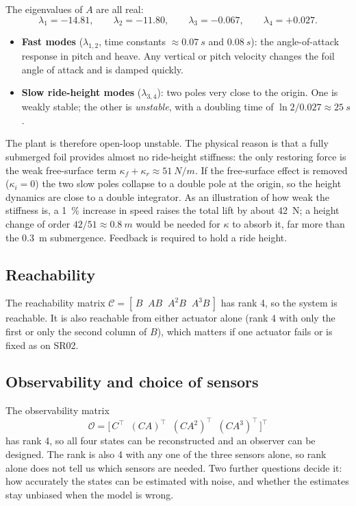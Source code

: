 \documentclass[11pt,a4paper]{article}
\newcommand{\T}{^{\top}}
\begin{document}
The eigenvalues of $A$ are all real:
\[
\lambda_1=-14.81, \qquad \lambda_2=-11.80, \qquad
\lambda_3=-0.067, \qquad \lambda_4=+0.027 .
\]
\begin{itemize}
\item \textbf{Fast modes} ($\lambda_{1,2}$, time constants $\approx\SI{0.07}{s}$
      and $\SI{0.08}{s}$): the angle-of-attack response in pitch and heave. Any
      vertical or pitch velocity changes the foil angle of attack and is damped
      quickly.
\item \textbf{Slow ride-height modes} ($\lambda_{3,4}$): two poles very close to
      the origin. One is weakly stable; the other is \emph{unstable}, with a
      doubling time of $\ln 2/0.027\approx\SI{25}{s}$.
\end{itemize}
The plant is therefore open-loop unstable. The physical reason is that a fully
submerged foil provides almost no ride-height stiffness: the only restoring force
is the weak free-surface term $\kappa_f+\kappa_r\approx\SI{51}{N/m}$. If the
free-surface effect is removed ($\kappa_i=0$) the two slow poles collapse to a
double pole at the origin, so the height dynamics are close to a double
integrator. As an illustration of how weak the stiffness is, a \SI{1}{\percent}
increase in speed raises the total lift by about \SI{42}{N}; a height change of
order $42/51\approx\SI{0.8}{m}$ would be needed for $\kappa$ to absorb it, far
more than the \SI{0.3}{m} submergence. Feedback is required to hold a ride height.

\subsection{Reachability}

The reachability matrix
$\mathcal C=[\,B\;\;AB\;\;A^2B\;\;A^3B\,]$ has rank 4, so the system is reachable.
It is also reachable from either actuator alone (rank 4 with only the first or
only the second column of $B$), which matters if one actuator fails or is fixed
as on SR02.

\subsection{Observability and choice of sensors}
\label{sec:obsv}

The observability matrix
\[
\mathcal O=\bigl[\,C\T\;\;(CA)\T\;\;(CA^2)\T\;\;(CA^3)\T\,\bigr]\T
\]
has rank 4, so all four states can be reconstructed and an observer can be
designed. The rank is also 4 with any one of the three sensors alone, so rank
alone does not tell us which sensors are needed. Two further questions decide
it: how accurately the states can be estimated with noise, and whether the
estimates stay unbiased when the model is wrong.
\end{document}
